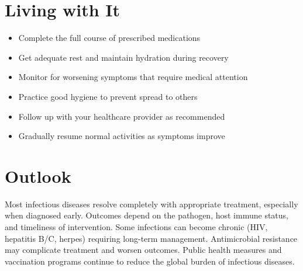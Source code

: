 \section{Living with It}
\begin{itemize}[noitemsep]
  \item Complete the full course of prescribed medications
  \item Get adequate rest and maintain hydration during recovery
  \item Monitor for worsening symptoms that require medical attention
  \item Practice good hygiene to prevent spread to others
  \item Follow up with your healthcare provider as recommended
  \item Gradually resume normal activities as symptoms improve
\end{itemize}
\section{Outlook}
Most infectious diseases resolve completely with appropriate treatment, especially when diagnosed early. Outcomes depend on the pathogen, host immune status, and timeliness of intervention. Some infections can become chronic (HIV, hepatitis B/C, herpes) requiring long-term management. Antimicrobial resistance may complicate treatment and worsen outcomes. Public health measures and vaccination programs continue to reduce the global burden of infectious diseases.
